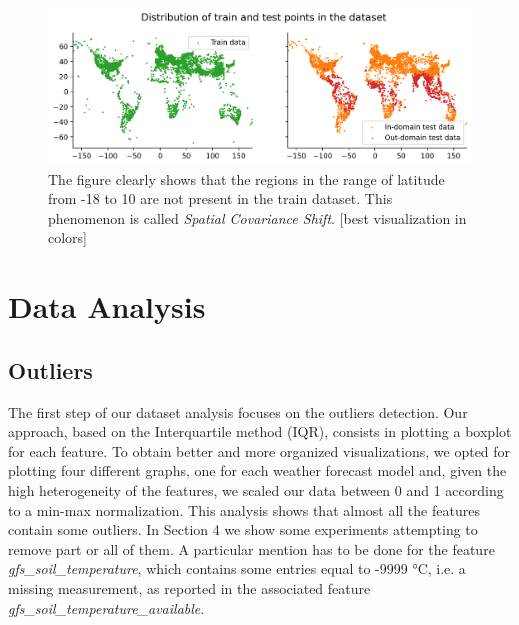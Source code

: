 \documentclass{article}
\begin{document}
    \begin{figure}[h]
        \centering
        \includegraphics[width=\linewidth]{assets/train-test-diff.png}
        \caption{The figure clearly shows that the regions in the range of latitude from -18 to 10 are not present in the train dataset. This phenomenon is called \textit{Spatial Covariance Shift}. [best visualization in colors] }
        \label{fig:train-test-diff}
    \end{figure}

\section{Data Analysis}
    \subsection{Outliers}
    The first step of our dataset analysis focuses on the outliers detection. Our approach, based on the Interquartile method (IQR), consists in plotting a boxplot for each feature. To obtain better and more organized visualizations, we opted for plotting four different graphs, one for each weather forecast model and, given the high heterogeneity of the features, we scaled our data between 0 and 1 according to a min-max normalization. This analysis shows that almost all the features contain some outliers. In Section 4 we show some experiments attempting to remove part or all of them. A particular mention has to be done for the feature \textit{gfs\_soil\_temperature}, which contains some entries equal to -9999 °C, i.e. a missing measurement, as reported in the associated feature \textit{gfs\_soil\_temperature\_available}.
    
    
    
\end{document}

